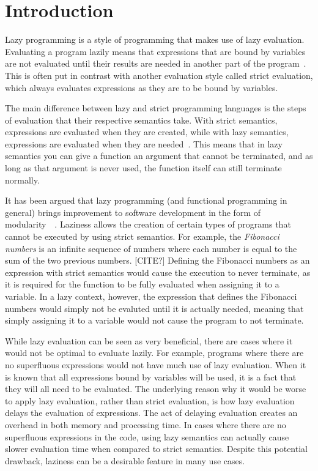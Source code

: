 \chapter{Introduction}
\label{chapter:intro}
Lazy programming is a style of programming that makes use of lazy evaluation.
Evaluating a program lazily means that expressions that are bound by variables
are not evaluated until their results are needed in another part of the
program~\cite{Lazyeval6:online}. This is often put in contrast with another
evaluation style called strict evaluation, which always evaluates expressions
as they are to be bound by variables. 

The main difference between lazy and strict programming languages is the steps
of evaluation that their respective semantics take. With strict semantics,
expressions are evaluated when they are created, while with lazy semantics,
expressions are evaluated when they are needed~\cite{ThunkHas27:online}.
This means that in lazy semantics
you can give a function an argument that cannot be terminated, and as long as
that argument is never used, the function itself can still terminate normally.

It has been argued that lazy programming (and functional programming in general)
brings improvement to software development in the form of
modularity~\cite{Hu1989}~\cite{Hu2015}. Laziness allows the creation of certain
types of programs that cannot be executed by using strict semantics.
For example, the \textit{Fibonacci numbers} is an infinite sequence of numbers
where each number is equal to the sum of the two previous numbers. [CITE?]
Defining the Fibonacci numbers as an expression with strict semantics would
cause the execution to never terminate, as it is required for the function to be
fully evaluated when assigning it to a variable. In a lazy context, however,
the expression that defines the Fibonacci numbers would simply not be evaluted
until it is actually needed, meaning that simply assigning it to a variable
would not cause the program to not terminate.

While lazy evaluation can be seen as very beneficial, there are cases where it
would not be optimal to evaluate lazily. For example, programs where there are
no superfluous expressions would not have much use of lazy evaluation. When it
is known that all expressions bound by variables will be used, it is a fact that
they will all need to be evaluated. The underlying reason why it would be worse
to apply lazy evaluation, rather than strict evaluation, is how lazy evaluation
delays the evaluation of expressions. The act of delaying evaluation creates
an overhead in both memory and processing time.
In cases where there are no superfluous expressions in the code, using lazy
semantics can actually cause slower evaluation time when compared to
strict semantics. Despite this potential drawback, laziness can be a desirable
feature in many use cases. 

